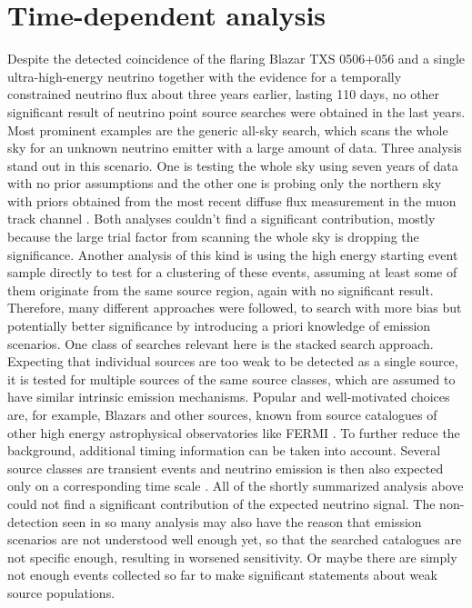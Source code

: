 \chapter{Time-dependent analysis}
  \label{chp:time_dep}


Despite the detected coincidence of the flaring Blazar TXS 0506+056 and a single ultra-high-energy neutrino together with the evidence for a temporally constrained neutrino flux about three years earlier, lasting 110 days, no other significant result of neutrino point source searches were obtained in the last years.
Most prominent examples are the generic all-sky search, which scans the whole sky for an unknown neutrino emitter with a large amount of data.
Three analysis stand out in this scenario.
One is testing the whole sky using seven years of data with no prior assumptions \cite{Aartsen:2016oji} and the other one is probing only the northern sky with priors obtained from the most recent diffuse flux measurement in the muon track channel \cite{Haack:2017dxi,Reimann:2017owh}.
Both analyses couldn't find a significant contribution, mostly because the large trial factor from scanning the whole sky is dropping the significance.
Another analysis of this kind is using the high energy starting event sample directly to test for a clustering of these events, assuming at least some of them originate from the same source region, again with no significant result.
Therefore, many different approaches were followed, to search with more bias but potentially better significance by introducing a priori knowledge of emission scenarios.
One class of searches relevant here is the stacked search approach.
Expecting that individual sources are too weak to be detected as a single source, it is tested for multiple sources of the same source classes, which are assumed to have similar intrinsic emission mechanisms.
Popular and well-motivated choices are, for example, Blazars and other sources, known from source catalogues of other high energy astrophysical observatories like FERMI \cite{Aartsen:2017zvw,Aartsen:2017wea,Aartsen:2016lir,Aartsen:2017ujz}.
To further reduce the background, additional timing information can be taken into account.
Several source classes are transient events and neutrino emission is then also expected only on a corresponding time scale \cite{Bianco:2007fe,Komossa:2015qya,Katz:2016dti}.
All of the shortly summarized analysis above could not find a significant contribution of the expected neutrino signal.
The non-detection seen in so many analysis may also have the reason that emission scenarios are not understood well enough yet, so that the searched catalogues are not specific enough, resulting in worsened sensitivity.
Or maybe there are simply not enough events collected so far to make significant statements about weak source populations.

